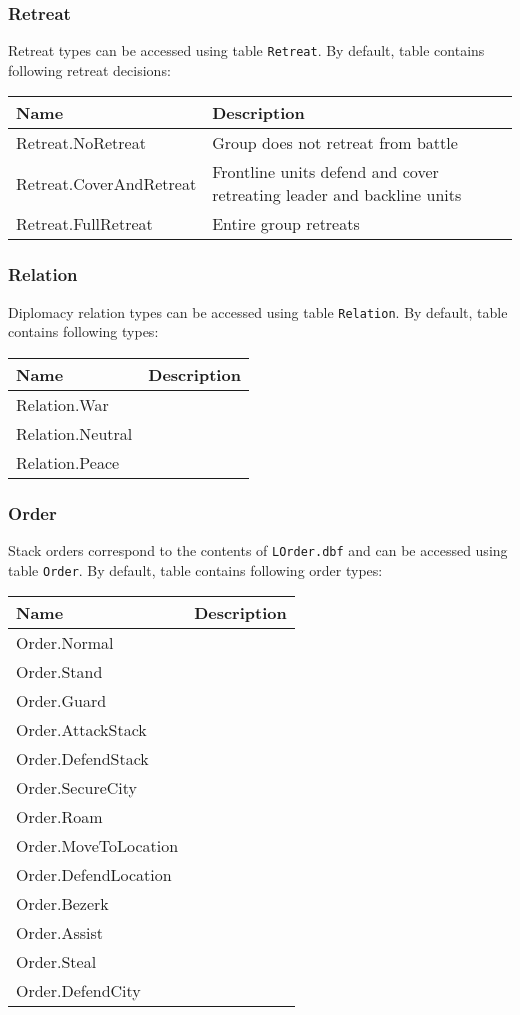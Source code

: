 \subsubsection{Retreat}
\label{Retreat}
Retreat types can be accessed using table \texttt{Retreat}.
By default, table contains following retreat decisions:\\
\begin{tabularx}{\linewidth}{| l | X |}
\hline
\textbf{Name} & \textbf{Description} \\
\hline
Retreat.NoRetreat & Group does not retreat from battle\\
\hline
Retreat.CoverAndRetreat & Frontline units defend and cover retreating leader and backline units\\
\hline
Retreat.FullRetreat & Entire group retreats\\
\hline
\end{tabularx}

\subsubsection{Relation}
\label{Relation}
Diplomacy relation types can be accessed using table \texttt{Relation}.
By default, table contains following types:\\
\begin{tabularx}{\linewidth}{| l | X |}
\hline
\textbf{Name} & \textbf{Description} \\
\hline
Relation.War &\\
\hline
Relation.Neutral &\\
\hline
Relation.Peace &\\
\hline
\end{tabularx}

\subsubsection{Order}
\label{Order}
Stack orders correspond to the contents of \texttt{LOrder.dbf} and can be accessed using table \texttt{Order}.
By default, table contains following order types:\\
\begin{tabularx}{\linewidth}{| l | X |}
\hline
\textbf{Name} & \textbf{Description} \\
\hline
Order.Normal &\\
\hline
Order.Stand &\\
\hline
Order.Guard &\\
\hline
Order.AttackStack &\\
\hline
Order.DefendStack &\\
\hline
Order.SecureCity &\\
\hline
Order.Roam &\\
\hline
Order.MoveToLocation &\\
\hline
Order.DefendLocation &\\
\hline
Order.Bezerk &\\
\hline
Order.Assist &\\
\hline
Order.Steal &\\
\hline
Order.DefendCity &\\
\hline
\end{tabularx}


